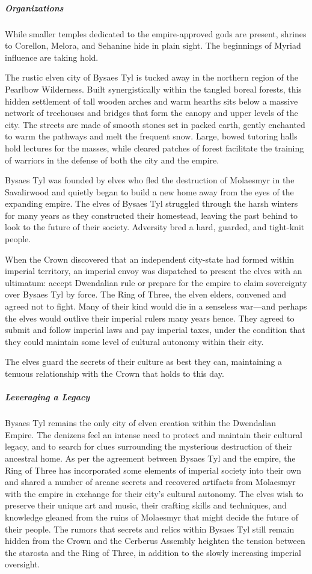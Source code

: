 \documentclass[10pt,a4paper,twoside,bg=print,twocolumn,openany,nodeprecatedcode]{dndbook}
\begin{document}
\subparagraph{Organizations}
While smaller temples dedicated to the empire-approved gods are present, shrines to Corellon, Melora, and Sehanine hide in plain sight. The beginnings of Myriad influence are taking hold.

The rustic elven city of Bysaes Tyl is tucked away in the northern region of the Pearlbow Wilderness. Built synergistically within the tangled boreal forests, this hidden settlement of tall wooden arches and warm hearths sits below a massive network of treehouses and bridges that form the canopy and upper levels of the city. The streets are made of smooth stones set in packed earth, gently enchanted to warm the pathways and melt the frequent snow. Large, bowed tutoring halls hold lectures for the masses, while cleared patches of forest facilitate the training of warriors in the defense of both the city and the empire.

Bysaes Tyl was founded by elves who fled the destruction of Molaesmyr in the Savalirwood and quietly began to build a new home away from the eyes of the expanding empire. The elves of Bysaes Tyl struggled through the harsh winters for many years as they constructed their homestead, leaving the past behind to look to the future of their society. Adversity bred a hard, guarded, and tight-knit people.

When the Crown discovered that an independent city-state had formed within imperial territory, an imperial envoy was dispatched to present the elves with an ultimatum: accept Dwendalian rule or prepare for the empire to claim sovereignty over Bysaes Tyl by force. The Ring of Three, the elven elders, convened and agreed not to fight. Many of their kind would die in a senseless war—and perhaps the elves would outlive their imperial rulers many years hence. They agreed to submit and follow imperial laws and pay imperial taxes, under the condition that they could maintain some level of cultural autonomy within their city.

The elves guard the secrets of their culture as best they can, maintaining a tenuous relationship with the Crown that holds to this day.

\subparagraph{Leveraging a Legacy}
Bysaes Tyl remains the only city of elven creation within the Dwendalian Empire. The denizens feel an intense need to protect and maintain their cultural legacy, and to search for clues surrounding the mysterious destruction of their ancestral home. As per the agreement between Bysaes Tyl and the empire, the Ring of Three has incorporated some elements of imperial society into their own and shared a number of arcane secrets and recovered artifacts from Molaesmyr with the empire in exchange for their city's cultural autonomy. The elves wish to preserve their unique art and music, their crafting skills and techniques, and knowledge gleaned from the ruins of Molaesmyr that might decide the future of their people. The rumors that secrets and relics within Bysaes Tyl still remain hidden from the Crown and the Cerberus Assembly heighten the tension between the starosta and the Ring of Three, in addition to the slowly increasing imperial oversight.
\end{document}
